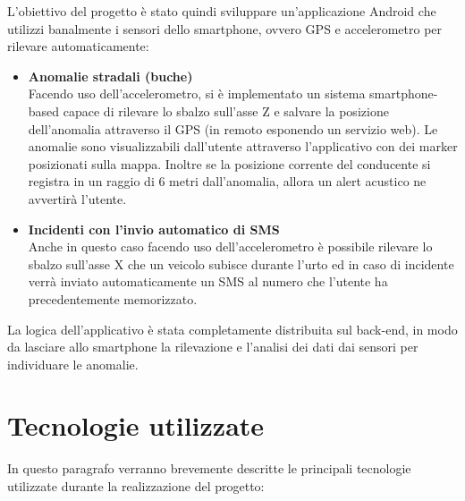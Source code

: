 \documentclass[a4paper, 11pt]{article} %
\begin{document}
L’obiettivo del progetto è stato quindi sviluppare un'applicazione Android che utilizzi banalmente i sensori dello smartphone, ovvero GPS e accelerometro per rilevare automaticamente:
\begin{itemize}
	
	\item \textbf{Anomalie stradali (buche)} \\
	Facendo uso dell'accelerometro, si è implementato un sistema smartphone-based capace di rilevare lo sbalzo sull'asse Z e salvare la posizione dell’anomalia attraverso il GPS (in remoto esponendo un servizio web). Le anomalie sono visualizzabili dall’utente attraverso l’applicativo con dei marker posizionati sulla mappa. Inoltre se la posizione corrente del conducente si registra in un raggio di 6 metri dall’anomalia, allora un alert acustico ne avvertirà l'utente. \cite{Mohamed2016}
	
	\item \textbf{Incidenti con l'invio automatico di SMS} \\
	Anche in questo caso facendo uso dell'accelerometro è possibile rilevare lo sbalzo sull’asse X che un veicolo subisce durante l’urto ed in caso di incidente verrà inviato automaticamente un SMS al numero che l'utente ha precedentemente memorizzato. \cite{Faiz2016}
	
\end{itemize} 
La logica dell'applicativo è stata completamente distribuita sul back-end, in modo da lasciare allo smartphone la rilevazione e l'analisi dei dati dai sensori per individuare le anomalie.
 
\section{Tecnologie utilizzate}
In questo paragrafo verranno brevemente descritte le principali tecnologie utilizzate durante la realizzazione del progetto:
\end{document}
